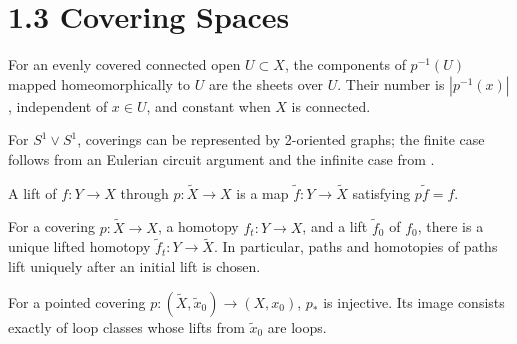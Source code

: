 \section{1.3 Covering Spaces}
\label{sec:covering-spaces}

\begin{definition}
\label{def:covering-space-sheets}
\leanok
{}
For an evenly covered connected open $U\subset X$, the components of $p^{-1}(U)$
mapped homeomorphically to $U$ are the sheets over $U$. Their number is
$|p^{-1}(x)|$, independent of $x\in U$, and constant when $X$ is connected.
\end{definition}

For $S^1\vee S^1$, coverings can be represented by 2-oriented graphs; the
finite case follows from an Eulerian circuit argument and the infinite case
from \cite{Konig1990}.

\begin{definition}
\label{def:lift-of-a-map}
\leanok
{}
A lift of $f:Y\to X$ through $p:\widetilde X\to X$ is a map
$\widetilde f:Y\to\widetilde X$ satisfying $p\widetilde f=f$.
\end{definition}

\begin{proposition}
\label{prop:covering-homotopy-property}
\leanok
{}
For a covering $p:\widetilde X\to X$, a homotopy $f_t:Y\to X$, and a lift
$\widetilde f_0$ of $f_0$, there is a unique lifted homotopy
$\widetilde f_t:Y\to\widetilde X$. In particular, paths and homotopies of
paths lift uniquely after an initial lift is chosen.
\end{proposition}

\begin{proposition}
\label{prop:covering-map-pi1-injective}
\leanok
{}
For a pointed covering $p:(\widetilde X,\widetilde x_0)\to(X,x_0)$, $p_*$
is injective. Its image consists exactly of loop classes whose lifts from
$\widetilde x_0$ are loops.
\end{proposition}

